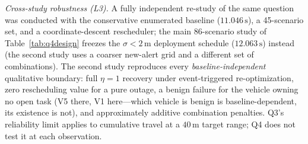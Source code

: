 \emph{Cross-study robustness (L3).} A fully independent re-study of the same question
was conducted with the conservative enumerated baseline ($11.046\,\mathrm{s}$), a
45-scenario set, and a coordinate-descent rescheduler; the main 86-scenario study of
Table~\ref{tab:q4design} freezes the $\sigma<2\,\mathrm{m}$ deployment schedule
($12.063\,\mathrm{s}$) instead (the second study uses a coarser new-alert grid and a
different set of combinations). The second study reproduces every
\emph{baseline-independent} qualitative boundary: full $\eta=1$ recovery under
event-triggered re-optimization, zero rescheduling value for a pure outage, a benign
failure for the vehicle owning no open task (V5 there, V1 here---which vehicle is
benign is baseline-dependent, its existence is not), and approximately additive
combination penalties.
Q3's reliability limit applies to cumulative
travel at a $40\,\mathrm{m}$ target range; Q4 does not test it at each observation.
